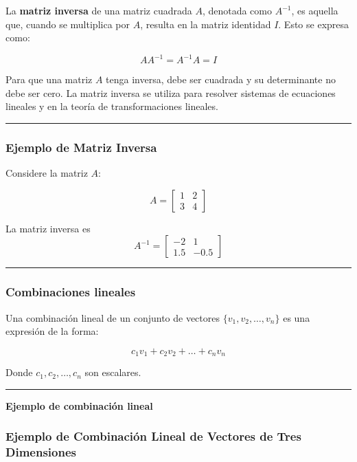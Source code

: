 \documentclass[
  letterpaper,
  DIV=11,
  numbers=noendperiod]{scrartcl}
\begin{document}
La \textbf{matriz inversa} de una matriz cuadrada \(A\), denotada como
\(A^{-1}\), es aquella que, cuando se multiplica por \(A\), resulta en
la matriz identidad \(I\). Esto se expresa como:

\[
AA^{-1} = A^{-1}A = I
\]

Para que una matriz \(A\) tenga inversa, debe ser cuadrada y su
determinante no debe ser cero. La matriz inversa se utiliza para
resolver sistemas de ecuaciones lineales y en la teoría de
transformaciones lineales.

\begin{center}\rule{0.5\linewidth}{0.5pt}\end{center}

\subsubsection{Ejemplo de Matriz
Inversa}\label{ejemplo-de-matriz-inversa}

Considere la matriz \(A\):

\[
A = \begin{bmatrix}
1 & 2 \\
3 & 4
\end{bmatrix}
\]

La matriz inversa es \[
A^{-1} = \begin{bmatrix}
-2 & 1 \\
1.5 & -0.5
\end{bmatrix}
\]

\begin{center}\rule{0.5\linewidth}{0.5pt}\end{center}

\subsubsection{Combinaciones lineales}\label{combinaciones-lineales}

Una combinación lineal de un conjunto de vectores
\(\{v_1, v_2, \ldots, v_n\}\) es una expresión de la forma:

\[ c_1 v_1 + c_2 v_2 + \ldots + c_n v_n \]

Donde \(c_1, c_2, \ldots, c_n\) son escalares.

\begin{center}\rule{0.5\linewidth}{0.5pt}\end{center}

\textbf{Ejemplo de combinación lineal}

\subsubsection{Ejemplo de Combinación Lineal de Vectores de Tres
Dimensiones}\label{ejemplo-de-combinaciuxf3n-lineal-de-vectores-de-tres-dimensiones}
\end{document}
